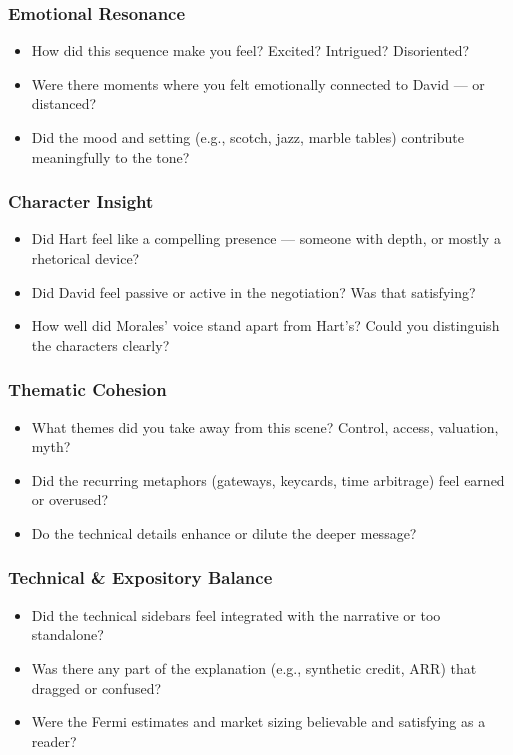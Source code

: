 \subsubsection*{Emotional Resonance}

\begin{itemize}
\item How did this sequence make you feel? Excited? Intrigued? Disoriented?
\item Were there moments where you felt emotionally connected to David — or distanced?
\item Did the mood and setting (e.g., scotch, jazz, marble tables) contribute meaningfully to the tone?
\end{itemize}

\subsubsection*{Character Insight}

\begin{itemize}
\item Did Hart feel like a compelling presence — someone with depth, or mostly a rhetorical device?
\item Did David feel passive or active in the negotiation? Was that satisfying?
\item How well did Morales' voice stand apart from Hart’s? Could you distinguish the characters clearly?
\end{itemize}

\subsubsection*{Thematic Cohesion}

\begin{itemize}
\item What themes did you take away from this scene? Control, access, valuation, myth?
\item Did the recurring metaphors (gateways, keycards, time arbitrage) feel earned or overused?
\item Do the technical details enhance or dilute the deeper message?
\end{itemize}

\subsubsection*{Technical \& Expository Balance}

\begin{itemize}
\item Did the technical sidebars feel integrated with the narrative or too standalone?
\item Was there any part of the explanation (e.g., synthetic credit, ARR) that dragged or confused?
\item Were the Fermi estimates and market sizing believable and satisfying as a reader?
\end{itemize}

